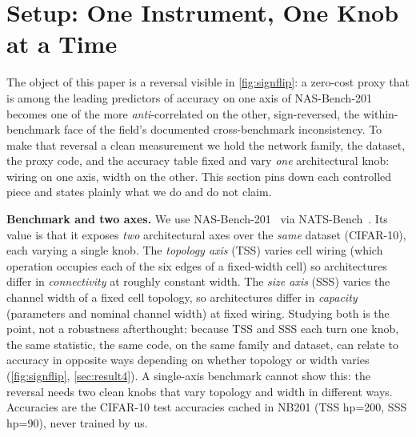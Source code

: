 \section{Setup: One Instrument, One Knob at a Time}
\label{sec:setup}

The object of this paper is a reversal visible in \cref{fig:signflip}:
a zero-cost proxy that is among the leading predictors of accuracy on
one axis of NAS-Bench-201 becomes one of the more \emph{anti}-correlated
on the other, sign-reversed, the within-benchmark face of the field's
documented cross-benchmark inconsistency. To make that reversal a clean
measurement we hold the network family, the dataset, the proxy code, and the
accuracy table fixed and vary \emph{one} architectural knob: wiring on one axis,
width on the other. This section pins down each controlled piece and states
plainly what we do and do not claim.

\textbf{Benchmark and two axes.}
We use NAS-Bench-201~\cite{dong2020nasbench201} via
NATS-Bench~\cite{dong2021natsbench}. Its value is that it exposes \emph{two}
architectural axes over the \emph{same} dataset (CIFAR-10), each varying a single
knob. The \emph{topology axis} (TSS) varies cell wiring (which operation occupies
each of the six edges of a fixed-width cell) so architectures differ in
\emph{connectivity} at roughly constant width. The \emph{size axis} (SSS) varies
the channel width of a fixed cell topology, so architectures differ in
\emph{capacity} (parameters and nominal channel width) at fixed wiring. Studying
both is the point, not a robustness afterthought: because TSS and SSS each turn
one knob, the same statistic, the same code, on the same family and dataset, can
relate to accuracy in opposite ways depending on whether topology or width
varies (\cref{fig:signflip}, \cref{sec:result4}). A single-axis benchmark cannot
show this: the reversal needs two clean knobs that vary topology and width in
different ways. Accuracies are the CIFAR-10 test accuracies
cached in NB201 (TSS hp=200, SSS hp=90), never trained by us.

